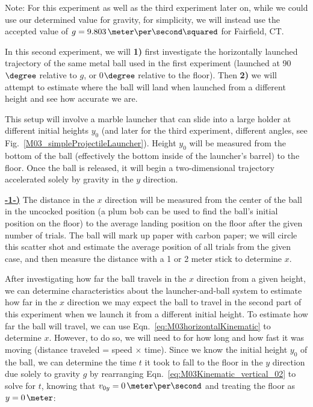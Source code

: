 Note: For this experiment as well as the third experiment later on, while we could use our determined value for gravity, for simplicity, we will instead use the accepted value of $g = 9.803\,\meter\per\second\squared$ for Fairfield, CT.

In this second experiment, we will \textbf{1)} first investigate the horizontally launched trajectory of the same metal ball used in the first experiment (launched at 90$\degree$ relative to $g$, or 0$\degree$ relative to the floor). Then \textbf{2)} we will attempt to estimate where the ball will land when launched from a different height and see how accurate we are.

This setup will involve a marble launcher that can slide into a large holder at different initial heights $y_{0}$ (and later for the third experiment, different angles, see Fig.~\ref{M03_simpleProjectileLauncher}). Height $y_{0}$ will be measured from the bottom of the ball (effectively the bottom inside of the launcher's barrel) to the floor. Once the ball is released, it will begin a two-dimensional trajectory accelerated solely by gravity in the $y$ direction.

\underline{\textbf{-1-)}} The distance in the $x$ direction will be measured from the center of the ball in the uncocked position (a plum bob can be used to find the ball's initial position on the floor) to the average landing position on the floor after the given number of trials. The ball will mark up paper with carbon paper; we will circle this scatter shot and estimate the average position of all trials from the given case, and then measure the distance with a 1 or 2 meter stick to determine $x$.

After investigating how far the ball travels in the $x$ direction from a given height, we can determine characteristics about the launcher-and-ball system to estimate how far in the $x$ direction we may expect the ball to travel in the second part of this experiment when we launch it from a different initial height. To estimate how far the ball will travel, we can use Eqn.~\ref{eq:M03horizontalKinematic} to determine $x$. However, to do so, we will need to for how long and how fast it was moving (distance traveled = speed $\times$ time). Since we know the initial height $y_{0}$ of the ball, we can determine the time $t$ it took to fall to the floor in the $y$ direction due solely to gravity $g$ by rearranging Eqn.~\ref{eq:M03Kinematic_vertical_02} to solve for $t$, knowing that $v_{0y} = 0\,\meter\per\second$ and treating the floor as $y = 0\,\meter$:

